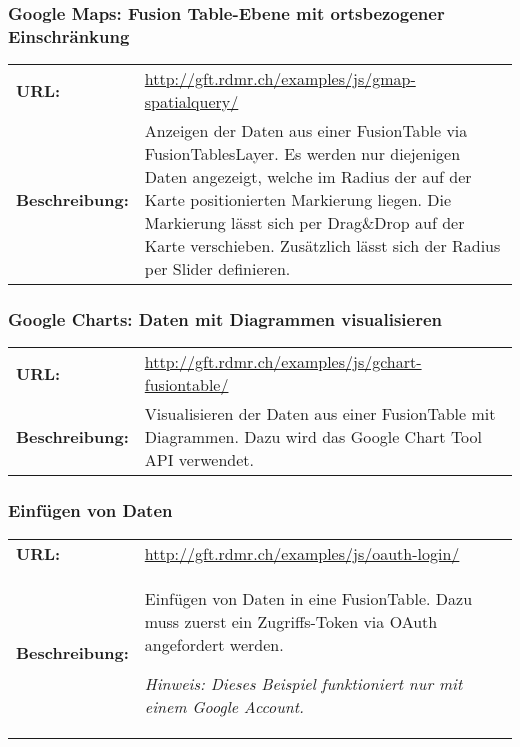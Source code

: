 \subsubsection{Google Maps: Fusion Table-Ebene mit ortsbezogener Einschränkung}
\begin{table}[H]
\centering
\begin{tabular}{p{0.2\twocelltabwidth}p{0.8\twocelltabwidth}}
\textbf{URL:} & \url{http://gft.rdmr.ch/examples/js/gmap-spatialquery/} \\ 
\textbf{Beschreibung:} & Anzeigen der Daten aus einer FusionTable via FusionTablesLayer. Es werden nur diejenigen Daten angezeigt, welche im Radius der auf der Karte positionierten Markierung liegen. Die Markierung lässt sich per Drag{\&}Drop auf der Karte verschieben. Zusätzlich lässt sich der Radius per Slider definieren. \\ 
\end{tabular} 
\end{table}

\subsubsection{Google Charts: Daten mit Diagrammen visualisieren}
\begin{table}[H]
\centering
\begin{tabular}{p{0.2\twocelltabwidth}p{0.8\twocelltabwidth}}
\textbf{URL:} & \url{http://gft.rdmr.ch/examples/js/gchart-fusiontable/} \\ 
\textbf{Beschreibung:} & Visualisieren der Daten aus einer FusionTable mit Diagrammen. Dazu wird das Google Chart Tool \gls{API} verwendet. \\ 
\end{tabular} 
\end{table}

\subsubsection{Einfügen von Daten}
\begin{table}[H]
\centering
\begin{tabular}{p{0.2\twocelltabwidth}p{0.8\twocelltabwidth}}
\textbf{URL:} & \url{http://gft.rdmr.ch/examples/js/oauth-login/} \\ 
\textbf{Beschreibung:} & Einfügen von Daten in eine FusionTable. Dazu muss zuerst ein Zugriffs-Token via \gls{OAuth} angefordert werden.

\textit{Hinweis: Dieses Beispiel funktioniert nur mit einem Google Account.} \\ 
\end{tabular} 
\end{table}

